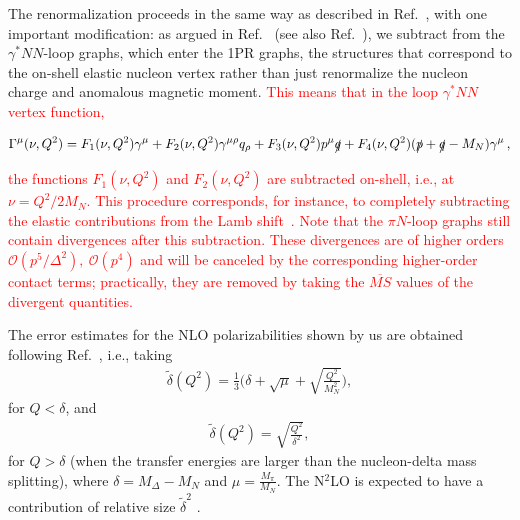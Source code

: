 \documentclass[twocolumn,prc,showpacs,nofootinbib,preprintnumbers,amsmath,amssymb,superscriptaddress]{revtex4-1}
\begin{document}
The renormalization proceeds in the same way as described in Ref.~\cite{Lensky:2009uv}, with one important modification: as argued in
Ref.~\cite{Birse:2012eb} (see also Ref.~\cite{Alarcon:2013cba}), we subtract from the $\gamma^* NN$-loop graphs, which enter the 1PR graphs,
the structures that correspond to the on-shell elastic nucleon vertex rather than just renormalize the nucleon charge and anomalous magnetic moment.
\textcolor{red}{This means that in the loop $\gamma^* NN$ vertex function,}
\begin{widetext}
\begin{equation}
\Gamma^\mu(\nu,Q^2)=F_1(\nu,Q^2)\gamma^\mu+F_2(\nu,Q^2)\gamma^{\mu\rho}q_\rho+F_3(\nu,Q^2)p^\mu\slashed{q}+F_4(\nu,Q^2)(\slashed{p}+\slashed{q}-M_N)\gamma^\mu\,,
\end{equation}
\end{widetext}
\textcolor{red}{the functions $F_1(\nu,Q^2)$ and $F_2(\nu,Q^2)$ are subtracted on-shell, i.e., at $\nu=Q^2/2M_N$. This procedure corresponds, for instance,
to completely subtracting the elastic contributions from the Lamb shift~\cite{Alarcon:2013cba}. Note that the $\pi N$-loop graphs
still contain divergences after this subtraction. These divergences are of higher orders $\mathcal{O}(p^5/\varDelta^2),\ \mathcal{O}(p^4)$
and will be canceled by the corresponding higher-order
contact terms; practically, they are removed by taking the $\overline{MS}$ values of the divergent quantities.}

The error estimates for the NLO polarizabilities shown by us are obtained following Ref.~\cite{Pascalutsa:2005vq}, i.e., taking
\begin{align}
  \tilde{\delta}(Q^2) = \frac{1}{3} \Big(\delta +\sqrt{\mu} + \sqrt{\frac{Q^2}{M_N^2}}\Big),
\end{align}
for $Q< \delta$, and
\begin{align}
  \tilde{\delta}(Q^2) = \sqrt{\frac{Q^2}{\delta^2}},
\end{align}
for $Q>\delta$ (when the transfer energies are larger than the nucleon-delta mass splitting), where  $\delta = M_\Delta - M_N$ and $\mu = \frac{M_\pi}{M_N}$.
The N$^2$LO is expected to have a contribution of relative size $\tilde{\delta}^2$ \cite{Pascalutsa:2005vq}.

\end{document}

